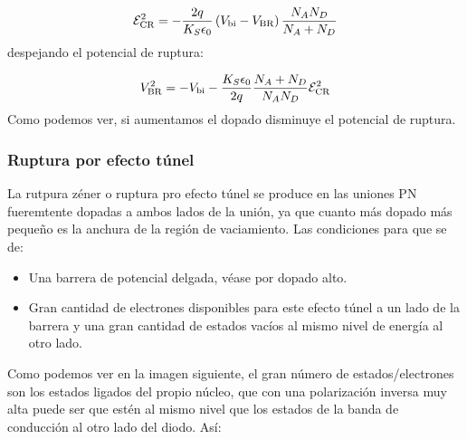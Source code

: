\begin{equation}
  \mathcal{E}_{\text{CR}}^2  = - \frac{2q}{K_S\epsilon_0} \left( V_{\text{bi}}-V_{\text{BR}} \right) \frac{N_AN_D}{N_A+N_D}
\end{equation}
despejando el potencial de ruptura:

\begin{equation}
    V_{\text{BR}}^2  = -V_{\text{bi}} - \frac{K_S\epsilon_0}{2q} \frac{N_A+N_D}{N_AN_D} \mathcal{E}_{\text{CR}}^2
  \end{equation}
Como podemos ver, si aumentamos el dopado disminuye el potencial de ruptura. 

\subsubsection{Ruptura por efecto túnel}

La rutpura zéner o ruptura pro efecto túnel se produce en las uniones PN fueremtente dopadas a ambos lados de la unión, ya que cuanto más dopado más pequeño es la anchura de la región de vaciamiento. Las condiciones para que se de: 

\begin{itemize}
    \item Una barrera de potencial delgada, véase por dopado alto. 
    \item Gran cantidad de electrones disponibles para este efecto túnel a un lado de la barrera y una gran cantidad de estados vacíos al mismo nivel de energía al otro lado. 
\end{itemize}
Como podemos ver en la imagen siguiente, el gran número de estados/electrones son los estados ligados del propio núcleo, que con una polarización inversa muy alta puede ser que estén al mismo nivel que los estados de la banda de conducción al otro lado del diodo. Así: 

